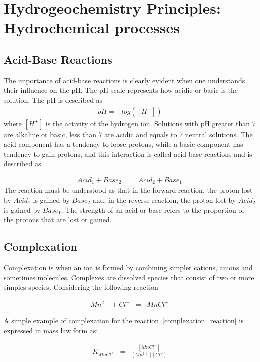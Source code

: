 \section{Hydrogeochemistry Principles: Hydrochemical processes}

\subsection{Acid-Base Reactions}
The importance of acid-base reactions is clearly evident when one understands their influence on the pH. The pH scale represents how acidic or basic is the solution. The pH is described as
\begin{eqnarray}
pH = - log([H^+])
\end{eqnarray}
where $[H^+]$ is the activity of the hydrogen ion. Solutions with pH greater than 7 are alkaline or basic, less than 7 are acidic and equals to 7 neutral solutions.
The acid component has a tendency to loose protons, while a basic component has tendency to gain protons, and this interaction is called acid-base reactions and is described as

\begin{eqnarray}
Acid_1 + Base_2 &=& Acid_2 + Base_1
\end{eqnarray}
The reaction must be understood as that in the forward reaction, the proton lost by $Acid_1$ is gained by $Base_2$ and, in the reverse reaction, the proton lost by $Acid_2$ is gained by $Base_1$.  The strength of an acid or base refers to the proportion of the protons that are lost or gained. 

\subsection{Complexation}
Complexation is when an ion is formed by combining simpler cations, anions and sometimes molecules. Complexes are dissolved species that consist of two or more simples species. Considering the following reaction

\begin{eqnarray}\label{complexation_reaction}
Mn^{2+} + Cl^- &=& MnCl^+
\end{eqnarray}

A simple example of complexation for the reaction~\ref{complexation_reaction} is expressed in mass law form as:

\begin{eqnarray}
K_{MnCl^+} &=& \frac{[MnCl^+]}{[Mn^{2+}][Cl^-]}
\end{eqnarray}

